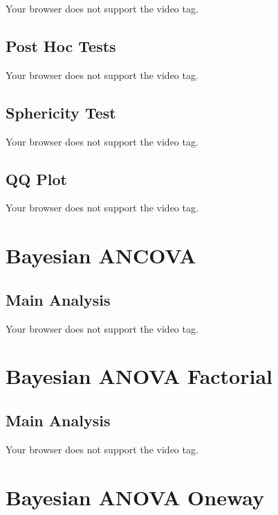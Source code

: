 \documentclass[
  letterpaper,
  DIV=11,
  numbers=noendperiod]{scrreprt}
\begin{document}
Your browser does not support the video tag.

\hypertarget{post-hoc-tests-1}{%
\subsection{Post Hoc Tests}\label{post-hoc-tests-1}}

Your browser does not support the video tag.

\hypertarget{sphericity-test}{%
\subsection{Sphericity Test}\label{sphericity-test}}

Your browser does not support the video tag.

\hypertarget{qq-plot}{%
\subsection{QQ Plot}\label{qq-plot}}

Your browser does not support the video tag.

\hypertarget{bayesian-ancova}{%
\section{Bayesian ANCOVA}\label{bayesian-ancova}}

\hypertarget{main-analysis-5}{%
\subsection{Main Analysis}\label{main-analysis-5}}

Your browser does not support the video tag.

\hypertarget{bayesian-anova-factorial}{%
\section{Bayesian ANOVA Factorial}\label{bayesian-anova-factorial}}

\hypertarget{main-analysis-6}{%
\subsection{Main Analysis}\label{main-analysis-6}}

Your browser does not support the video tag.

\hypertarget{bayesian-anova-oneway}{%
\section{Bayesian ANOVA Oneway}\label{bayesian-anova-oneway}}
\end{document}
